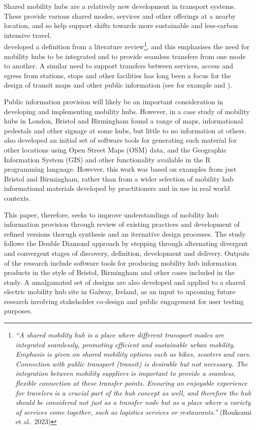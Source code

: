 \documentclass[preprint, 3p,
authoryear]{elsarticle} %
\begin{document}
Shared mobility hubs are a relatively new development in transport
systems.\\
These provide various shared modes, services and other offerings at a
nearby location, and so help support shifts towards more sustainable and
less-carbon intensive travel.\\
\citet{Roukouni:2023aa} developed a definition from a literature
review\footnote{ \emph{``A shared mobility hub is a place where
  different transport modes are integrated seamlessly, promoting
  efficient and sustainable urban mobility. Emphasis is given on shared
  mobility options such as bikes, scooters and cars. Connection with
  public transport (transit) is desirable but not necessary. The
  integration between mobility suppliers is important to provide a
  seamless, flexible connection at these transfer points. Ensuring an
  enjoyable experience for travelers is a crucial part of the hub
  concept as well, and therefore the hub should be considered not just
  as a transfer node but as a place where a variety of services come
  together, such as logistics services or restaurants.''} (Roukouni et
  al.~2023)}, and this emphasises the need for mobility hubs to be
integrated and to provide seamless transfers from one mode to another. A
similar need to support transfers between services, access and egress
from stations, stops and other facilities has long been a focus for the
design of transit maps and other public information (see for example
\citet{Ovenden:2003aa} and \citet{London-Transport-Museum:2016aa}).

Public information provision will likely be an important consideration
in developing and implementing mobility hubs. However, in a case study
of mobility hubs in London, Bristol and Birmingham
\citet{Reynolds:2026aa} found a range of maps, informational pedestals
and other signage at some hubs, but little to no information at others.
\citet{Reynolds:2026aa} also developed an initial set of software tools
for generating such material for other locations using Open Street Maps
(OSM) data, and the Geographic Information System (GIS) and other
functionality available in the R programming language. However, this
work was based on examples from just Bristol and Birmingham, rather than
from a wider selection of mobility hub informational materials developed
by practitioners and in use in real world contexts.

This paper, therefore, seeks to improve understandings of mobility hub
information provision through review of existing practices and
development of refined versions thorugh synthesis and an iternative
design processes. The study follows the Double Diamond approach
\cite{UK-Design-Council:0aa} by stepping through alternating divergent
and convergent stages of discovery, definition, development and
delivery. Outputs of the research include software tools for producing
mobility hub information products in the style of Bristol, Birmingham
and other cases included in the study. A amalgamated set of designs are
also developed and applied to a shared electric mobility hub site in
Galway, Ireland, as an input to upcoming future research involving
stakeholder co-design and public engagement for user testing purposes.
\end{document}
